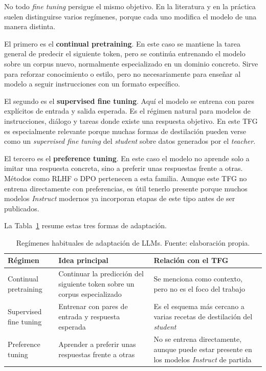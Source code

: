 No todo \textit{fine tuning} persigue el mismo objetivo. En la literatura y en la práctica suelen distinguirse varios regímenes, porque cada uno modifica el modelo de una manera distinta.

El primero es el \textbf{continual pretraining}. En este caso se mantiene la tarea general de predecir el siguiente token, pero se continúa entrenando el modelo sobre un corpus nuevo, normalmente especializado en un dominio concreto. Sirve para reforzar conocimiento o estilo, pero no necesariamente para enseñar al modelo a seguir instrucciones con un formato específico.

El segundo es el \textbf{supervised fine tuning}. Aquí el modelo se entrena con pares explícitos de entrada y salida esperada. Es el régimen natural para modelos de instrucciones, diálogo y tareas donde existe una respuesta objetivo. En este TFG es especialmente relevante porque muchas formas de destilación pueden verse como un \textit{supervised fine tuning} del \textit{student} sobre datos generados por el \textit{teacher}.

El tercero es el \textbf{preference tuning}. En este caso el modelo no aprende solo a imitar una respuesta concreta, sino a preferir unas respuestas frente a otras. Métodos como RLHF o DPO pertenecen a esta familia. Aunque este TFG no entrena directamente con preferencias, es útil tenerlo presente porque muchos modelos \textit{Instruct} modernos ya incorporan etapas de este tipo antes de ser publicados.

La Tabla~\ref{tab:regimenes-finetuning} resume estas tres formas de adaptación.

\begin{table}[H]
\centering
\caption{Regímenes habituales de adaptación de LLMs. Fuente: elaboración propia.}
\label{tab:regimenes-finetuning}
\footnotesize
\begin{tabularx}{\textwidth}{>{\raggedright\arraybackslash}p{3.3cm} >{\raggedright\arraybackslash}X >{\raggedright\arraybackslash}p{4.0cm}}
\toprule
\textbf{Régimen} & \textbf{Idea principal} & \textbf{Relación con el TFG} \\
\midrule
Continual pretraining & Continuar la predicción del siguiente token sobre un corpus especializado & Se menciona como contexto, pero no es el foco del trabajo \\
\addlinespace
Supervised fine tuning & Entrenar con pares de entrada y respuesta esperada & Es el esquema más cercano a varias recetas de destilación del \textit{student} \\
\addlinespace
Preference tuning & Aprender a preferir unas respuestas frente a otras & No se entrena directamente, aunque puede estar presente en los modelos \textit{Instruct} de partida \\
\bottomrule
\end{tabularx}
\end{table}

